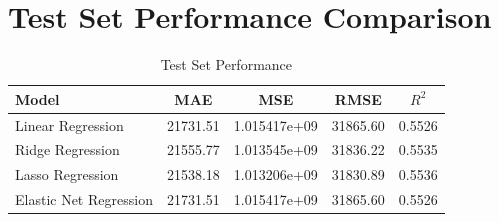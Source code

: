 \documentclass[11pt]{article}
\begin{document}
\section*{Test Set Performance Comparison}
\begin{table}[h!]
\centering
\renewcommand{\arraystretch}{1.3}
\caption{Test Set Performance}
\begin{tabular}{|l|c|c|c|c|}
\hline
Model & MAE & MSE & RMSE & $R^2$ \\ \hline
Linear Regression & 21731.51 & 1.015417e+09 & 31865.60 & 0.5526 \\
Ridge Regression & 21555.77 & 1.013545e+09 & 31836.22 & 0.5535 \\
Lasso Regression & 21538.18 & 1.013206e+09 & 31830.89 & 0.5536 \\
Elastic Net Regression & 21731.51 & 1.015417e+09 & 31865.60 & 0.5526 \\ \hline
\end{tabular}
\end{table}

\end{document}
